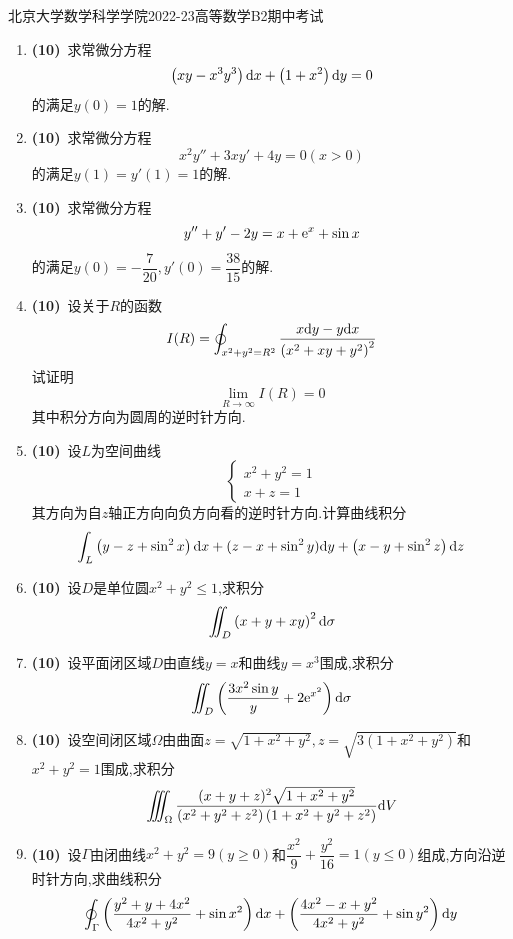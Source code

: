 \documentclass{ctexart}
\begin{document}
\pagestyle{empty}
\begin{center}\Large
    北京大学数学科学学院2022-23高等数学B2期中考试
\end{center}
\begin{enumerate}[leftmargin=*,label=\textbf{\arabic*.}]
    \item \textbf{(10)}\ 求常微分方程
    \[\left(xy-x^3y^3\right)\mathrm{d} x+\left(1+x^2\right)\mathrm{d} y=0\]
    的满足$y(0)=1$的解.

    \item \textbf{(10)}\ 求常微分方程
    \[x^2y''+3xy'+4y=0(x>0)\]
    的满足$y(1)=y'(1)=1$的解.

    \item \textbf{(10)}\ 求常微分方程
    \[y''+y'-2y=x+\mathrm{e}^x+\sin x\]
    的满足$y(0)=-\dfrac{7}{20},y'(0)=\dfrac{38}{15}$的解.

    \item \textbf{(10)}\ 设关于$R$的函数
    \[I(R)=\oint_{x^2+y^2=R^2}\dfrac{x\mathrm{d} y-y\mathrm{d} x}{\left(x^2+xy+y^2\right)^2}\]
    试证明
    \[\lim_{R\to\infty}I(R)=0\]
    其中积分方向为圆周的逆时针方向.

    \item \textbf{(10)}\ 设$L$为空间曲线
    \[\left\{\begin{array}{l}
        x^2+y^2=1\\
        x+z=1
    \end{array}\right.\]
    其方向为自$z$轴正方向向负方向看的逆时针方向.计算曲线积分
    \[\int_{L}\left(y-z+\sin^2x\right)\mathrm{d} x+(z-x+\sin^2y)\mathrm{d} y+\left(x-y+\sin^2z\right)\mathrm{d} z\]

    \item \textbf{(10)}\ 设$D$是单位圆$x^2+y^2\leqslant1$,求积分
    \[\iint_D\left(x+y+xy\right)^2\mathrm{d}\sigma\]

    \item \textbf{(10)}\ 设平面闭区域$D$由直线$y=x$和曲线$y=x^3$围成,求积分
    \[\iint_D\left(\dfrac{3x^2\sin y}{y}+2\mathrm{e}^{x^2}\right)\mathrm{d}\sigma\]

    \item \textbf{(10)}\ 设空间闭区域$\Omega$由曲面$z=\sqrt{1+x^2+y^2},z=\sqrt{3\left(1+x^2+y^2\right)}$和$x^2+y^2=1$围成,求积分
    \[\iiint_{\Omega}\dfrac{(x+y+z)^2\sqrt{1+x^2+y^2}}{\left(x^2+y^2+z^2\right)\left(1+x^2+y^2+z^2\right)}\mathrm{d} V\]

    \item \textbf{(10)}\ 设$\Gamma$由闭曲线$x^2+y^2=9(y\geqslant0)$和$\dfrac{x^2}{9}+\dfrac{y^2}{16}=1(y\leqslant0)$组成,方向沿逆时针方向,求曲线积分
    \[\oint_{\Gamma}\left(\dfrac{y^2+y+4x^2}{4x^2+y^2}+\sin x^2\right)\mathrm{d} x+\left(\dfrac{4x^2-x+y^2}{4x^2+y^2}+\sin y^2\right)\mathrm{d} y\]


\end{enumerate}
\end{document}
